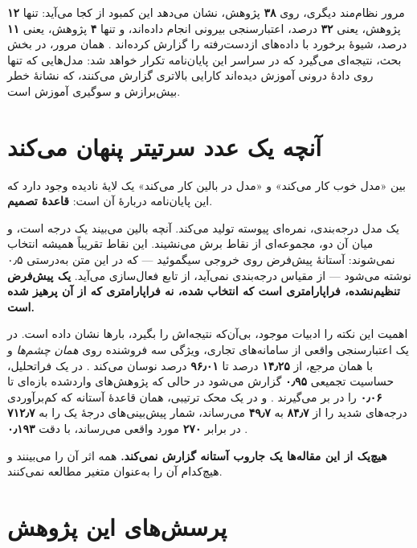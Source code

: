 مرور نظام‌مند دیگری، روی \textbf{\num{۳۸}} پژوهش، نشان می‌دهد این کمبود از کجا می‌آید: تنها
\textbf{\num{۱۲}} پژوهش، یعنی \textbf{\num{۳۲}} درصد، اعتبارسنجی بیرونی انجام داده‌اند، و تنها
\textbf{\num{۴}} پژوهش، یعنی \textbf{\num{۱۱}} درصد، شیوهٔ برخورد با داده‌های ازدست‌رفته را گزارش
کرده‌اند \cite{yang2025review}. همان مرور، در بخش بحث، نتیجه‌ای می‌گیرد که در سراسر این
پایان‌نامه تکرار خواهد شد: مدل‌هایی که تنها روی دادهٔ درونی آموزش دیده‌اند کارایی بالاتری
گزارش می‌کنند، که نشانهٔ خطر بیش‌برازش و سوگیری آموزش است.

\section{آنچه یک عدد سرتیتر پنهان می‌کند}

بین «مدل خوب کار می‌کند» و «مدل در بالین کار می‌کند» یک لایهٔ نادیده وجود دارد که این
پایان‌نامه دربارهٔ آن است: \textbf{قاعدهٔ تصمیم}.

یک مدل درجه‌بندی، نمره‌ای پیوسته تولید می‌کند. آنچه بالین می‌بیند یک درجه است، و میان آن دو،
مجموعه‌ای از نقاط برش می‌نشیند. این نقاط تقریباً همیشه انتخاب نمی‌شوند: آستانهٔ پیش‌فرض
 روی خروجی سیگموئید — که در این متن به‌درستی \num{۰٫۵} نوشته می‌شود — از مقیاس
درجه‌بندی نمی‌آید، از تابع فعال‌سازی می‌آید. \textbf{یک پیش‌فرض تنظیم‌نشده، فراپارامتری است
که انتخاب شده، نه فراپارامتری که از آن پرهیز شده است.}

اهمیت این نکته را ادبیات موجود، بی‌آن‌که نتیجه‌اش را بگیرد، بارها نشان داده است. در یک
اعتبارسنجی واقعی از سامانه‌های تجاری، ویژگی سه فروشنده روی \emph{همان چشم‌ها} و با همان مرجع،
از \textbf{\num{۱۴٫۲۵}} درصد تا \textbf{\num{۹۶٫۰۱}} درصد نوسان می‌کند \cite{duggal2025realworld}. در یک
فراتحلیل، حساسیت تجمیعی \textbf{\num{۰٫۹۵}} گزارش می‌شود در حالی که پژوهش‌های واردشده بازه‌ای تا
\textbf{\num{۰٫۰۶}} را در بر می‌گیرند \cite{tahir2025meta}. و در یک محک ترتیبی، همان قاعدهٔ آستانه
که کم‌برآوردی درجه‌های شدید را از \textbf{\num{۸۴٫۷}} به \textbf{\num{۴۹٫۷}} می‌رساند، شمار
پیش‌بینی‌های درجهٔ یک را به \textbf{\num{۷۱۲٫۷}} در برابر \textbf{\num{۲۷۰}} مورد واقعی می‌رساند، با
دقت \textbf{\num{۰٫۱۹۳}} \cite{sheng2026orderdr}.

\textbf{هیچ‌یک از این مقاله‌ها یک جاروب آستانه گزارش نمی‌کند.} همه اثر آن را می‌بینند و
هیچ‌کدام آن را به‌عنوان متغیر مطالعه نمی‌کنند.

\section{پرسش‌های این پژوهش}

